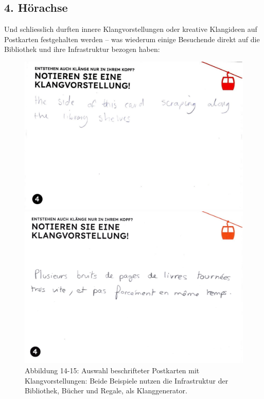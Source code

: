 \documentclass[a4paper,
fontsize=11pt,
oneside,
numbers=noperiodatend,
parskip=half-,
bibliography=totoc,
final
]{scrartcl}
\begin{document}
\hypertarget{huxf6rachse-3}{%
\subsection{4. Hörachse}\label{huxf6rachse-3}}

Und schliesslich durften innere Klangvorstellungen oder kreative
Klangideen auf Postkarten festgehalten werden -- was wiederum einige
Besuchende direkt auf die Bibliothek und ihre Infrastruktur bezogen
haben:


\begin{figure}[h]
    \centering
    \begin{minipage}[b]{0.45\textwidth}
        \centering
        \includegraphics[width=\textwidth]{img/Abb14.jpg}
    \end{minipage}
    \begin{minipage}[b]{0.45\textwidth}
        \centering
        \includegraphics[width=\textwidth]{img/Abb15.jpg}
    \end{minipage}
    \caption{Abbildung 14-15: Auswahl beschrifteter Postkarten mit Klangvorstellungen: Beide Beispiele nutzen die Infrastruktur der Bibliothek, Bücher und Regale, als Klanggenerator.}
\end{figure}
\end{document}
